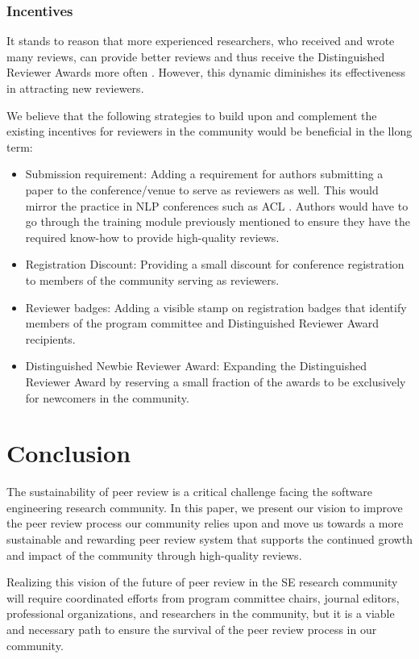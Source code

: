 \documentclass[sigconf]{acmart}
\begin{document}
\subsubsection{Incentives}
It stands to reason that more experienced researchers, who received and wrote many reviews, can provide better reviews and thus receive the Distinguished Reviewer Awards more often \cite{Ernst2021}. However, this dynamic diminishes its effectiveness in attracting new reviewers.

We believe that the following strategies to build upon and complement the existing incentives for reviewers in the community would be beneficial in the llong term:

\begin{itemize}
    \item Submission requirement: Adding a requirement for authors submitting a paper to the conference/venue to serve as reviewers as well. This would mirror the practice in NLP conferences such as ACL \cite{ACL}. Authors would have to go through the training module previously mentioned to ensure they have the required know-how to provide high-quality reviews. 
    \item Registration Discount: Providing a small discount for conference registration to members of the community serving as reviewers.
    \item Reviewer badges: Adding a visible stamp on registration badges that identify members of the program committee and Distinguished Reviewer Award recipients.
    \item Distinguished Newbie Reviewer Award: Expanding the Distinguished Reviewer Award by reserving a small fraction of the awards to be exclusively for newcomers in the community. 
\end{itemize}

\section{Conclusion}

The sustainability of peer review is a critical challenge facing the software engineering research community. In this paper, we present our vision to improve the peer review process our community relies upon and move us towards a more sustainable and rewarding peer review system that supports the continued growth and impact of the community through high-quality reviews.

Realizing this vision of the future of peer review in the SE research community will require coordinated efforts from program committee chairs, journal editors, professional organizations, and researchers in the community, but it is a viable and necessary path to ensure the survival of the peer review process in our community. 

\balance


\end{document}

